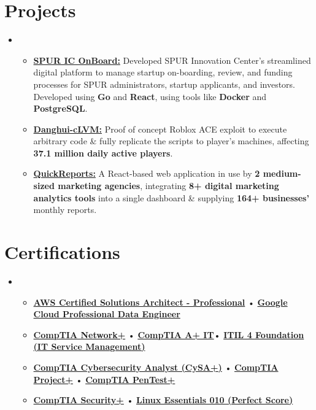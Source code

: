 \documentclass[letterpaper,11pt]{article}
\newcommand{\cvitem}[1]{
  \item\small{
    {#1\vspace{-2pt}}
  }
}
\newcommand{\cvheadingstart}{\begin{itemize}[leftmargin=0in, label={}]}
\newcommand{\cvheadingend}{\end{itemize}}
\newcommand{\cvitemstart}{\begin{itemize}\justifying}
\newcommand{\cvitemend}{\end{itemize}\vspace{-5pt}}
\begin{document}
\section{Projects}
\cvheadingstart
\item
\cvitemstart
  \cvitem{\textbf{\href{https://github.com/KonferCA/SPUR-onboard/}{SPUR IC OnBoard:}} Developed SPUR Innovation Center's streamlined digital platform to manage startup on-boarding, review, and funding processes for SPUR administrators, startup applicants, and investors. Developed using \textbf{Go} and \textbf{React}, using tools like \textbf{Docker} and \textbf{PostgreSQL}.}
  \vspace{6pt}
  \cvitem{\textbf{\href{https://github.com/AmirAgassi/Danghui-LVM}{Danghui-cLVM:}} Proof of concept Roblox ACE exploit to execute arbitrary code \& fully replicate the scripts to player's machines, affecting \textbf{37.1 million daily active players}.}
  \vspace{6pt}
  \cvitem{\textbf{\href{https://quickreports.me}{QuickReports:}} A React-based web application in use by \textbf{2 medium-sized marketing agencies}, integrating \textbf{8+ digital marketing analytics tools} into a single dashboard \& supplying \textbf{164+ businesses'} monthly reports.}
\cvitemend
\cvheadingend
\section{Certifications}
\cvheadingstart
\item
\cvitemstart
  \cvitem{
    \textbf{\href{https://cp.certmetrics.com/amazon/en/public/verify/credential/2LC36B3CWM411J3K}{AWS Certified Solutions Architect - Professional}} •
    \textbf{\href{https://www.credly.com/badges/c9811ec9-a04e-439f-a1bf-f4e18f11c6ee/public_url}{Google Cloud Professional Data Engineer}}
  }
  \cvitem{
    \textbf{\href{https://www.credly.com/badges/438afda8-6dca-4ad4-94db-0d44baf82fd6/public_url}{CompTIA Network+}} •
    \textbf{\href{https://www.credly.com/badges/f474c77c-bbcf-4327-aa37-3dd99da3ba62/public_url}{CompTIA A+ IT}}• \textbf{\href{https://www.linkedin.com/in/amir-agassi/details/certifications/1736993044174/single-media-viewer/?profileId=ACoAAEZvsg8BHJ2SKQfF3qavwxRrYll5Acx8QSg}{ITIL 4 Foundation (IT Service Management)}}
  }
  \cvitem{
    \textbf{\href{https://www.credly.com/earner/earned/badge/bfaf1b1c-51b4-4b34-b708-aa649e51a294}{CompTIA Cybersecurity Analyst (CySA+)}} •
    \textbf{\href{https://www.credly.com/badges/eb621d7d-a8c0-4233-b246-907323b95429/public_url}{CompTIA Project+}} •
    \textbf{\href{https://www.credly.com/earner/earned/badge/d592ba39-9b53-43a3-b502-a357987484a4}{CompTIA PenTest+}}
  }
  \cvitem{
    \textbf{\href{https://www.credly.com/badges/ddb1f2a4-4e5d-4f97-bc55-ff52a9ade614/public_url}{CompTIA Security+}} •
    \textbf{\href{https://cs.lpi.org/caf/Xamman/certification/verify/LPI000645485/j6l5zdd7sf}{Linux Essentials 010 (Perfect Score)}}
  }
\cvitemend
\cvheadingend
\end{document}

